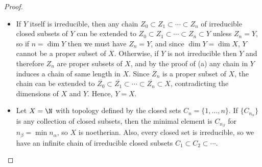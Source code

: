 \documentclass[a4paper]{article}
\begin{document}
\begin{enumerate} [label=\textbf{\arabic*.}, leftmargin=0em]
\begin{proof}
\begin{itemize} [leftmargin=0cm]
                  \item[(d)] If $Y$ itself is irreducible, then any chain $Z_0 \subset Z_1 \subset \cdots \subset Z_n$ of irreducible closed subsets of $Y$ can be extended to $Z_0 \subset Z_1 \subset \cdots \subset Z_n \subset Y$ unless $Z_n = Y$, so if $n = \dim{Y}$ then we must have $Z_n = Y$, and since $\dim{Y} = \dim{X}$, $Y$ cannot be a proper subset of $X$. Otherwise, if $Y$ is not irreducible then $Y$ and therefore $Z_n$ are proper subsets of $X$, and by the proof of (a) any chain in $Y$ induces a chain of same length in $X$. Since $\overline{Z}_n$ is a proper subset of $X$, the chain can be extended to $\overline{Z_0} \subset \overline{Z_1} \subset \cdots \subset \overline{Z_n} \subset X$, contradicting the dimensions of $X$ and $Y$. Hence, $Y = X$.

                  \item[(e)] Let $X = \N$ with topology defined by the closed sets $C_n = \{1, \dots, n \}$. If $\{ C_{n_\alpha}\}$ is any collection of closed subsets, then the minimal element is $C_{n_\beta}$ for $n_\beta = \min{n_\alpha}$, so $X$ is noetherian. Also, every closed set is irreducible, so we have an infinite chain of irreducible closed subsets $C_1 \subset C_2 \subset \cdots$.
              \end{itemize}
          \end{proof}

\end{enumerate}
\end{document}
